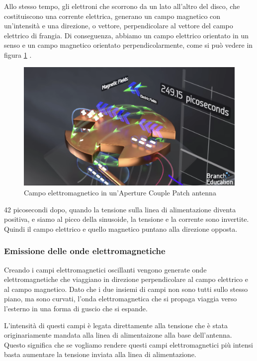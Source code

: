 Allo stesso tempo, gli elettroni che scorrono da un lato all'altro del disco, che costituiscono una corrente elettrica, generano un campo magnetico con un'intensità e una direzione, o vettore, perpendicolare al vettore del campo elettrico di frangia.
Di conseguenza, abbiamo un campo elettrico orientato in un senso e un campo magnetico orientato perpendicolarmente, come si può vedere in figura \ref{fig:aperture-couple-patch-antenna-em-field} \cite{branch_education_how_2022}.

\begin{figure}[htbp]
  \centering
  \includegraphics[width=0.8\linewidth]{./res/img/antenna_em_field.png}
  \caption{Campo elettromagnetico in un'Aperture Couple Patch antenna \cite{branch_education_how_2022}}
  \label{fig:aperture-couple-patch-antenna-em-field}
\end{figure}

42 picosecondi dopo, quando la tensione sulla linea di alimentazione diventa positiva, e siamo al picco della sinusoide, la tensione e la corrente sono invertite.
Quindi il campo elettrico e quello magnetico puntano alla direzione opposta.

\subsubsection{Emissione delle onde elettromagnetiche}
Creando i campi elettromagnetici oscillanti vengono generate onde elettromagnetiche che viaggiano in direzione perpendicolare al campo elettrico e al campo magnetico.
Dato che i due insiemi di campi non sono tutti sullo stesso piano, ma sono curvati, l'onda elettromagnetica che si propaga viaggia verso l'esterno in una forma di guscio che si espande.

L'intensità di questi campi è legata direttamente alla tensione che è stata originariamente mandata alla linea di alimentaizone alla base dell'antenna.
Questo significa che se vogliamo rendere questi campi elettromagnetici più intensi basta aumentare la tensione inviata alla linea di alimentazione.

